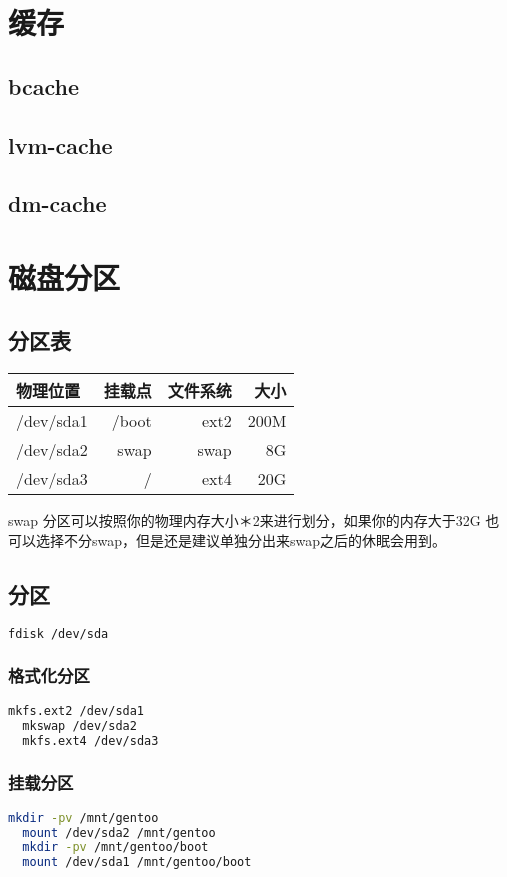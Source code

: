 \chapter{缓存}
\section{bcache}
\section{lvm-cache}
\section{dm-cache}


\chapter{磁盘分区}
\section{分区表}
\begin{tabular}{|l|r|r|r|}
  \hline
  物理位置 & 挂载点 & 文件系统 & 大小 \\
  \hline
  /dev/sda1 & /boot & ext2 & 200M \\
  \hline
  /dev/sda2 & swap & swap & 8G \\
  \hline
  /dev/sda3 & / & ext4 & 20G \\
  \hline
\end{tabular}

swap 分区可以按照你的物理内存大小＊2来进行划分，如果你的内存大于32G 也可以选择不分swap，但是还是建议单独分出来swap之后的休眠会用到。 
\section{分区}

\begin{lstlisting}[language=Bash]
  fdisk /dev/sda
\end{lstlisting}

\subsection{格式化分区}

\begin{lstlisting}[language=Bash]
  mkfs.ext2 /dev/sda1
  mkswap /dev/sda2
  mkfs.ext4 /dev/sda3 
\end{lstlisting}

\subsection{挂载分区}
\begin{lstlisting}[language=Bash]
  mkdir -pv /mnt/gentoo
  mount /dev/sda2 /mnt/gentoo
  mkdir -pv /mnt/gentoo/boot
  mount /dev/sda1 /mnt/gentoo/boot
\end{lstlisting}
